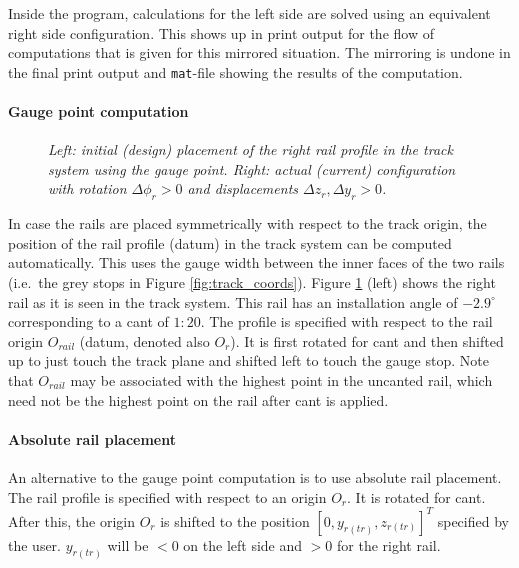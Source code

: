 \documentclass[12pt]{report}
\begin{document}
Inside the program, calculations for the left side are solved using
an equivalent right side configuration. This shows up in print output for
the flow of computations that is given for this mirrored situation. The
mirroring is undone in the final print output and {\tt mat}-file showing
the results of the computation.

\paragraph{Gauge point computation}

\begin{figure}[bt]
\centering
{}
\caption{\em Left: initial (design) placement of the right rail profile in
        the track system using the gauge point. Right: actual
        (current) configuration with rotation $\Delta\phi_{r}>0$ and
        displacements $\Delta z_{r}, \Delta y_{r}>0$.}
\label{fig:rail_coords}
\end{figure}

In case the rails are placed symmetrically with respect to the track
origin, the position of the rail profile (datum) in the track system can
be computed automatically. This uses the gauge width between the inner
faces of the two rails (i.e.\ the grey stops in Figure
\ref{fig:track_coords}).  Figure \ref{fig:rail_coords} (left) shows the
right rail as it is seen in the track system. This rail has an installation
angle of $-2.9^\circ$ corresponding to a cant of $1:20$. The profile is
specified with respect to the rail origin $O_{rail}$ (datum, denoted also
$O_{r}$). It is first rotated for cant and then shifted up to just touch
the track plane and shifted left to touch the gauge stop. Note that
$O_{rail}$ may be associated with the highest point in the uncanted rail,
which need not be the highest point on the rail after cant is applied.

\paragraph{Absolute rail placement}

An alternative to the gauge point computation is to use absolute rail
placement. The rail profile is specified with respect to an origin $O_r$.
It is rotated for cant. After this, the origin $O_r$ is shifted to the
position $[0,y_{r(tr)},z_{r(tr)}]^T$ specified by the user. $y_{r(tr)}$
will be $<0$ on the left side and $>0$ for the right rail.
\end{document}

